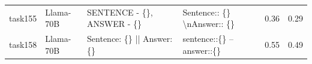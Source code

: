 \begin{longtable}{@{}p{0.8cm\tiny}p{1cm\tiny}p{4.1cm\ttfamily\tiny}p{4.1cm\ttfamily\tiny}p{0.8cm\tiny}p{0.8cm\tiny}@{}}
task155   & Llama-70B  & SENTENCE - \{\}, ANSWER - \{\}                                                                                                                                                                                                                                                                                                                                                                                                                                                                                          & Sentence:: \{\} \textbackslash{}nAnswer:: \{\}                                                                                                                                                                                                                                                                                                                                                                                                                                                                                                                                    & 0.36 & 0.29 \\
task158   & Llama-70B  & Sentence: \{\} || Answer: \{\}                                                                                                                                                                                                                                                                                                                                                                                                                                                                                          & sentence::\{\} -- answer::\{\}                                                                                                                                                                                                                                                                                                                                                                                                                                                                                                                                                    & 0.55 & 0.49 \\

\end{longtable}
